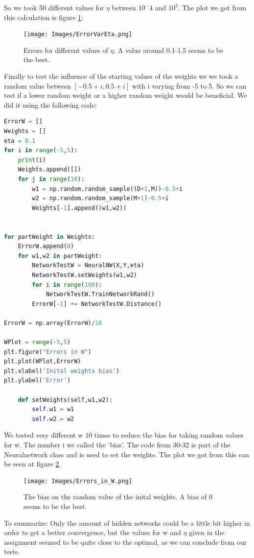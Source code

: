\documentclass[a4paper]{article}
\begin{document}
So we took 50 different values for $\eta$ between $10^-4$ and $10^2$. The plot we got from this calculation is figure \ref{EtaErr}:

\begin{figure}[H]
\texttt{[image: Images/ErrorVarEta.png]}
\caption{Errors for different values of $\eta$. A value around 0.1-1.5 seems to be the best.}
\label{EtaErr}
\end{figure}

Finally to test the influence of the starting values of the weights we we took a random value between $[-0.5+i,0.5+i]$ with i varying from -5 to 5. So we can test if a lower random weight or a higher random weight would be beneficial. We did it using the following code:

\begin{lstlisting}[language=Python]
ErrorW = []
Weights = []
eta = 0.1
for i in range(-5,5):
    print(i)
    Weights.append([])
    for j in range(10):
        w1 = np.random.random_sample((D+1,M))-0.5+i
        w2 = np.random.random_sample(M+1)-0.5+i
        Weights[-1].append((w1,w2))


for partWeight in Weights:
    ErrorW.append(0)
    for w1,w2 in partWeight:
        NetworkTestW = NeuralNW(X,Y,eta)
        NetworkTestW.setWeights(w1,w2)
        for i in range(100):
            NetworkTestW.TrainNetworkRand()
        ErrorW[-1] += NetworkTestW.Distance()

ErrorW = np.array(ErrorW)/10

WPlot = range(-5,5)
plt.figure("Errors in W")
plt.plot(WPlot,ErrorW)
plt.xlabel('Inital weights bias')
plt.ylabel('Error')

    def setWeights(self,w1,w2):
        self.w1 = w1
        self.w2 = w2
\end{lstlisting}

We tested very different w 10 times to reduce the bias for taking random values for w. The number i we called the 'bias'. The code from 30-32 is part of the Neuralnetwork class and is used to set the weights.
The plot we got from this can be seen at figure \ref{WDif}.

\begin{figure}[H]
\texttt{[image: Images/Errors\_in\_W.png]}
\caption{The bias on the random value of the inital weights. A bias of 0 seems to be the best.}
\label{WDif}
\end{figure}

To summarize: Only the amount of hidden networks could be a little bit higher in order to get a better convergence, but the values for w and $\eta$ given in the assignment seemed to be quite close to the optimal, as we can conclude from our tests.
\end{document}
